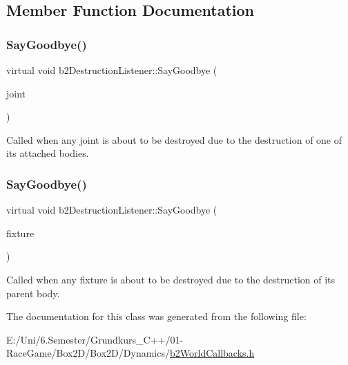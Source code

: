 \subsection{Member Function Documentation}
\mbox{\label{classb2_destruction_listener_a6cd15baa6e5c33118cf7173ab5bf6d58}} 
\subsubsection{\texorpdfstring{SayGoodbye()}{SayGoodbye()}\hspace{0.1cm}{\footnotesize\ttfamily [1/2]}}
{\footnotesize\ttfamily virtual void b2\+Destruction\+Listener\+::\+Say\+Goodbye (\begin{DoxyParamCaption}\item[{\mbox{\hyperlink{classb2_joint}{b2\+Joint}} $\ast$}]{joint }\end{DoxyParamCaption})\hspace{0.3cm}{\ttfamily [pure virtual]}}

Called when any joint is about to be destroyed due to the destruction of one of its attached bodies. \mbox{\label{classb2_destruction_listener_ab327c0073d162112c38d2fe8f8b9fce3}} 
\subsubsection{\texorpdfstring{SayGoodbye()}{SayGoodbye()}\hspace{0.1cm}{\footnotesize\ttfamily [2/2]}}
{\footnotesize\ttfamily virtual void b2\+Destruction\+Listener\+::\+Say\+Goodbye (\begin{DoxyParamCaption}\item[{\mbox{\hyperlink{classb2_fixture}{b2\+Fixture}} $\ast$}]{fixture }\end{DoxyParamCaption})\hspace{0.3cm}{\ttfamily [pure virtual]}}

Called when any fixture is about to be destroyed due to the destruction of its parent body. 

The documentation for this class was generated from the following file\+:\begin{DoxyCompactItemize}
\item 
E\+:/\+Uni/6.\+Semester/\+Grundkurs\+\_\+\+C++/01-\/\+Race\+Game/\+Box2\+D/\+Box2\+D/\+Dynamics/\mbox{\hyperlink{b2_world_callbacks_8h}{b2\+World\+Callbacks.\+h}}\end{DoxyCompactItemize}
